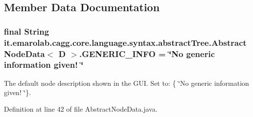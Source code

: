 \subsection{Member Data Documentation}
\hypertarget{classit_1_1emarolab_1_1cagg_1_1core_1_1language_1_1syntax_1_1abstractTree_1_1AbstractNodeData_3_01D_01_4_a26cd9d13d1d05af975d1571578b33755}{
\subsubsection[{G\-E\-N\-E\-R\-I\-C\-\_\-\-I\-N\-F\-O}]{\setlength{\rightskip}{0pt plus 5cm}final String it.\-emarolab.\-cagg.\-core.\-language.\-syntax.\-abstract\-Tree.\-Abstract\-Node\-Data$<$ D $>$.G\-E\-N\-E\-R\-I\-C\-\_\-\-I\-N\-F\-O = \char`\"{}No generic information given! \char`\"{}\hspace{0.3cm}{\ttfamily [static]}}}\label{classit_1_1emarolab_1_1cagg_1_1core_1_1language_1_1syntax_1_1abstractTree_1_1AbstractNodeData_3_01D_01_4_a26cd9d13d1d05af975d1571578b33755}
The default node description shown in the G\-U\-I. Set to\-: \{ \char`\"{}\-No generic information given! \char`\"{}\}. 

Definition at line 42 of file Abstract\-Node\-Data.\-java.

